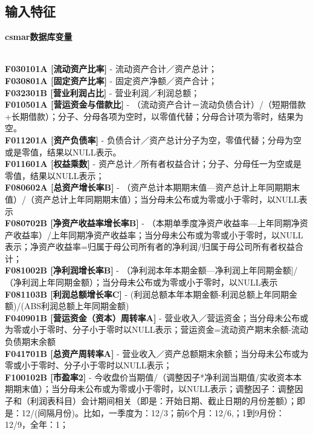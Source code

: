 \documentclass[12pt]{article} %
\begin{document}
	\subsection{输入特征}
	\noindent
	\begin{large}
	\noindent
	\textbf{csmar数据库变量}
	\end{large} \\
	\textbf{F030101A [流动资产比率]} - 流动资产合计／资产总计；\\
	\textbf{F030801A [固定资产比率] }- 固定资产净额／资产合计；\\
	\textbf{F032301B [营业利润占比] }- 营业利润／利润总额；\\
	\textbf{F010501A [营运资金与借款比]} - （流动资产合计－流动负债合计）/（短期借款+长期借款）；分子、分母各项为空时，以零值代替；分母合计项为零时，结果为空。
\\
	\textbf{F011201A [资产负债率]} - 负债合计／资产总计分子为空，零值代替；分母为空或是零值，结果以NULL表示。
\\
	\textbf{F011601A [权益乘数]} - 资产总计／所有者权益合计；分子、分母任一为空或是零值，结果以NULL表示；\\
	\textbf{F080602A [总资产增长率B] }- （资产总计本期期末值—资产总计上年同期期末值）/（资产总计上年同期期末值）；当分母未公布或为零或小于零时，以NULL表示
\\
	\textbf{F080702B [净资产收益率增长率B]} - （本期单季度净资产收益率—上年同期净资产收益率）/上年同期净资产收益率；当分母未公布或为零或小于零时，以NULL表示；净资产收益率=归属于母公司所有者的净利润/归属于母公司所有者权益合计；
 \\
	\textbf{F081002B [净利润增长率B] }- （净利润本年本期金额—净利润上年同期金额]/（净利润上年同期金额）；当分母未公布或为零或小于零时，以NULL表示
 \\
	\textbf{F081103B [利润总额增长率C]} - (利润总额本年本期金额-利润总额上年同期金额)/(ABS利润总额上年同期金额) \\
	\textbf{F040901B [营运资金（资本）周转率A] }- 营业收入／营运资金；当分母未公布或为零或小于零时、分子小于零时以NULL表示；营运资金=流动资产期末余额-流动负债期末余额
\\
	\textbf{F041701B [总资产周转率A] }- 营业收入／资产总额期末余额；当分母未公布或为零或小于零时、分子小于零时以NULL表示；\\
	\textbf{F100102B [市盈率2]} - 今收盘价当期值/（调整因子*净利润当期值/实收资本本期期末值）；当分母未公布或为零或小于零时，以NULL表示；调整因子：调整因子和（利润表科目）会计期间相关（即是：开始日期、截止日期的月份差额）；即是：12/(间隔月份)。比如，一季度为：12/3；前6个月：12/6,；1到9月份：12/9，全年：1；\\
\end{document}
